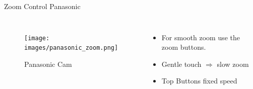 \documentclass[aspectratio=169]{beamer}
\begin{document}

\begin{frame}{Zoom Control Panasonic}
	\begin{columns}[T,onlytextwidth]
	\begin{figure} 
		\centering
		\texttt{[image: images/panasonic\_zoom.png]}
		\caption{Panasonic Cam}
	\end{figure}
		\begin{itemize}
			\item For smooth zoom use the zoom buttons.
			\item Gentle touch $\Rightarrow$ slow zoom
			\item Top Buttons fixed speed
		\end{itemize}
	\end{columns}
\end{frame}

\end{document}

